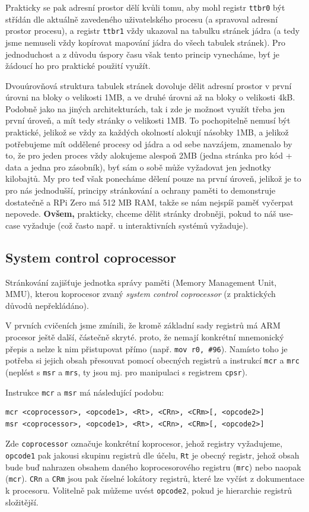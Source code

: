 \documentclass{article}
\begin{document}
Prakticky se pak adresní prostor dělí kvůli tomu, aby mohl registr \texttt{ttbr0} být střídán dle aktuálně zavedeného uživatelského procesu (a spravoval adresní prostor procesu), a registr \texttt{ttbr1} vždy ukazoval na tabulku stránek jádra (a tedy jsme nemuseli vždy kopírovat mapování jádra do všech tabulek stránek). Pro jednoduchost a z důvodu úspory času však tento princip vynecháme, byť je žádoucí ho pro praktické použití využít.

Dvouúrovňová struktura tabulek stránek dovoluje dělit adresní prostor v první úrovni na bloky o velikosti 1MB, a ve druhé úrovni až na bloky o velikosti 4kB. Podobně jako na jiných architekturách, tak i zde je možnost využít třeba jen první úroveň, a mít tedy stránky o velikosti 1MB. To pochopitelně nemusí být praktické, jelikož se vždy za každých okolností alokují násobky 1MB, a jelikož potřebujeme mít oddělené procesy od jádra a od sebe navzájem, znamenalo by to, že pro jeden proces vždy alokujeme alespoň 2MB (jedna stránka pro kód + data a jedna pro zásobník), byť sám o sobě může vyžadovat jen jednotky kilobajtů. My pro teď však ponecháme dělení pouze na první úroveň, jelikož je to pro nás jednodušší, principy stránkování a ochrany paměti to demonstruje dostatečně a RPi Zero má 512 MB RAM, takže se nám nejspíš paměť vyčerpat nepovede. \textbf{Ovšem,} prakticky, chceme dělit stránky drobněji, pokud to náš use-case vyžaduje (což často např. u interaktivních systémů vyžaduje).

\subsection{System control coprocessor}

Stránkování zajišťuje jednotka správy paměti (Memory Management Unit, MMU), kterou  koprocesor zvaný \emph{system control coprocessor} (z praktických důvodů nepřekládáno).

V prvních cvičeních jsme zmínili, že kromě základní sady registrů má ARM procesor ještě další, částečně skryté.  proto, že nemají konkrétní mnemonický přepis a nelze k nim přistupovat přímo (např. \texttt{mov r0, \#96}). Namísto toho je potřeba si jejich obsah přesouvat pomocí obecných registrů a instrukcí \texttt{mcr} a \texttt{mrc} (neplést s \texttt{msr} a \texttt{mrs}, ty jsou mj. pro manipulaci s registrem \texttt{cpsr}).

Instrukce \texttt{mcr} a \texttt{msr} má následující podobu:
\begin{lstlisting}
mcr <coprocessor>, <opcode1>, <Rt>, <CRn>, <CRm>[, <opcode2>]
msr <coprocessor>, <opcode1>, <Rt>, <CRn>, <CRm>[, <opcode2>]
\end{lstlisting}
Zde \texttt{coprocessor} označuje konkrétní koprocesor, jehož registry vyžadujeme, \texttt{opcode1} pak jakousi skupinu registrů dle účelu, \texttt{Rt} je obecný registr, jehož obsah bude buď nahrazen obsahem daného koprocesorového registru (\texttt{mrc}) nebo naopak (\texttt{mcr}). \texttt{CRn} a \texttt{CRm} jsou pak číselné lokátory registrů, které lze vyčíst z dokumentace k procesoru. Volitelně pak můžeme uvést \texttt{opcode2}, pokud je hierarchie registrů složitější.
\end{document}

